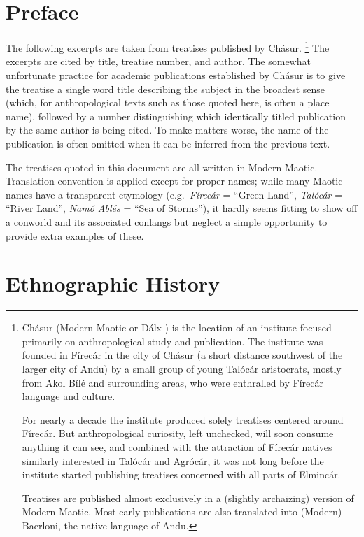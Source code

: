 \documentclass{article}
\let\oldthefootnote\thefootnote
\newcommand\oocfootnote[2][DarkGreen]{\renewcommand\thefootnote{\color{#1}\oldthefootnote}%
  \footnote{\color{#1}#2}%
  \renewcommand{\thefootnote}{\oldthefootnote}}
\begin{document}
\color{DarkGreen}

\section*{Preface}

The following excerpts are taken from treatises published by Chásur.\oocfootnote{Chásur (Modern Maotic  or Dálx \textipa{/h\textsubumlaut{E}:sO/}) is the location of an institute focused primarily on anthropological study and publication. The institute was founded in Fírecár in the city of Chásur (a short distance southwest of the larger city of Andu) by a small group of young Talócár aristocrats, mostly from Akol Bílé and surrounding areas, who were enthralled by Fírecár language and culture. \par For nearly a decade the institute produced solely treatises centered around Fírecár. But anthropological curiosity, left unchecked, will soon consume anything it can see, and combined with the attraction of Fírecár natives similarly interested in Talócár and Agrócár, it was not long before the institute started publishing treatises concerned with all parts of Elmincár. \par Treatises are published almost exclusively in a (slightly archaïzing) version of Modern Maotic. Most early publications are also translated into (Modern) Baerloni, the native language of Andu.} The excerpts are cited by title, treatise number, and author. The somewhat unfortunate practice for academic publications established by Chásur is to give the treatise a single word title describing the subject in the broadest sense (which, for anthropological texts such as those quoted here, is often a place name), followed by a number distinguishing which identically titled publication by the same author is being cited. To make matters worse, the name of the publication is often omitted when it can be inferred from the previous text.

The treatises quoted in this document are all written in Modern Maotic. Translation convention is applied except for proper names; while many Maotic names have a transparent etymology (e.g.\ \textit{Fírecár} = ``Green Land'', \textit{Talócár} = ``River Land'', \textit{Namó Ablés} = ``Sea of Storms''), it hardly seems fitting to show off a conworld and its associated conlangs but neglect a simple opportunity to provide extra examples of these.

\color{DarkGreen}
\section*{Ethnographic History}
\end{document}
